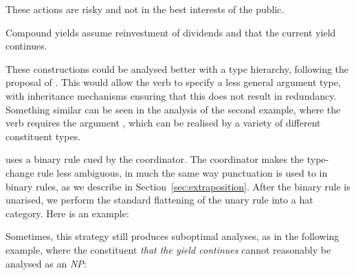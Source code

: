 \begin{lexamples}
\item These actions are risky and not in the best interests of the public.
\item Compound yields assume reinvestment of dividends and that the current
yield continues.
\end{lexamples}

These constructions could be analysed better with a type hierarchy, following
the proposal of \citet{mcconville:06}. This would allow the verb to specify a
less general argument type, with inheritance mechanisms ensuring that this does
not result in redundancy. Something similar can be seen in the analysis of the
second example, where the verb requires the argument , which
can be realised by a variety of different constituent types.

\ccgbank uses a binary rule cued by the coordinator. The coordinator makes the
type-change rule less ambiguous, in much the same way punctuation is used to in
binary rules, as we describe in Section~\ref{sec:extraposition}. After the
binary rule is unarised, we perform the standard flattening of the unary rule
into a hat category. Here is an example:

\begin{center}
\end{center}

Sometimes, this strategy still produces suboptimal analyses, as in the following
example, where the constituent \emph{that the yield continues} cannot reasonably
be analysed as an \emph{NP}:

